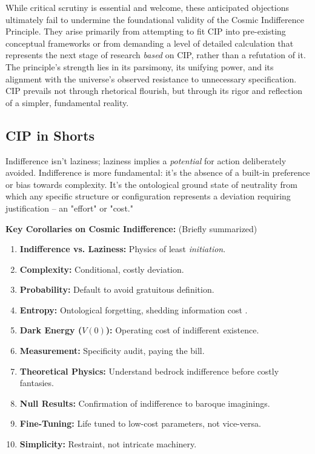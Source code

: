 \documentclass[11pt, a4paper]{article}
\begin{document}
While critical scrutiny is essential and welcome, these anticipated objections ultimately fail to undermine the foundational validity of the Cosmic Indifference Principle. They arise primarily from attempting to fit CIP into pre-existing conceptual frameworks or from demanding a level of detailed calculation that represents the next stage of research \textit{based} on CIP, rather than a refutation of it. The principle's strength lies in its parsimony, its unifying power, and its alignment with the universe's observed resistance to unnecessary specification. CIP prevails not through rhetorical flourish, but through its rigor and reflection of a simpler, fundamental reality.

\subsection{CIP in Shorts}

Indifference isn't laziness; laziness implies a \textit{potential} for action deliberately avoided. Indifference is more fundamental: it's the absence of a built-in preference or bias towards complexity. It's the ontological ground state of neutrality from which any specific structure or configuration represents a deviation requiring justification – an "effort" or "cost."

\textbf{Key Corollaries on Cosmic Indifference:} (Briefly summarized)
\begin{enumerate} \itemsep0em
    \item \textbf{Indifference vs. Laziness:} Physics of least \textit{initiation}.
    \item \textbf{Complexity:} Conditional, costly deviation.
    \item \textbf{Probability:} Default to avoid gratuitous definition.
    \item \textbf{Entropy:} Ontological forgetting, shedding information cost \cite{Shannon1948}.
    \item \textbf{Dark Energy ($V(0)$):} Operating cost of indifferent existence.
    \item \textbf{Measurement:} Specificity audit, paying the bill.
    \item \textbf{Theoretical Physics:} Understand bedrock indifference before costly fantasies.
    \item \textbf{Null Results:} Confirmation of indifference to baroque imaginings.
    \item \textbf{Fine-Tuning:} Life tuned to low-cost parameters, not vice-versa.
    \item \textbf{Simplicity:} Restraint, not intricate machinery.
\end{enumerate}
\end{document}
